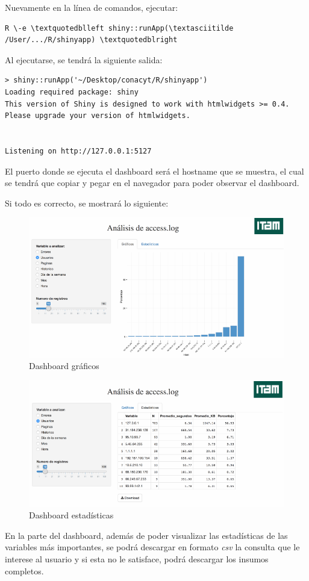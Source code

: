 Nuevamente en la línea de comandos, ejecutar:

\begin{lstlisting}
R \-e \textquotedblleft shiny::runApp(\textasciitilde /User/.../R/shinyapp) \textquotedblright
\end{lstlisting}

Al ejecutarse, se tendrá la siguiente salida:

\begin{lstlisting}
> shiny::runApp('~/Desktop/conacyt/R/shinyapp')
Loading required package: shiny
This version of Shiny is designed to work with htmlwidgets >= 0.4. 
Please upgrade your version of htmlwidgets.


Listening on http://127.0.0.1:5127
\end{lstlisting}

El puerto donde se ejecuta el dashboard será el hostname que se muestra,
el cual se tendrá que copiar y pegar en el navegador para poder observar
el dashboard.

Si todo es correcto, se mostrará lo siguiente:

\begin{figure}[H]
\centering
\includegraphics[width=1\textwidth]{Figures/unnamed-chunk-4-1}
\caption{Dashboard  gráficos}
\end{figure}

\begin{figure}[H]
\centering
\includegraphics[width=1\textwidth]{Figures/unnamed-chunk-5-1}
\caption{Dashboard  estadísticas}
\end{figure}

En la parte del dashboard, además de poder visualizar las estadísticas
de las variables más importantes, se podrá descargar en formato
\emph{csv} la consulta que le interese al usuario y si esta no le
satisface, podrá descargar los insumos completos.

